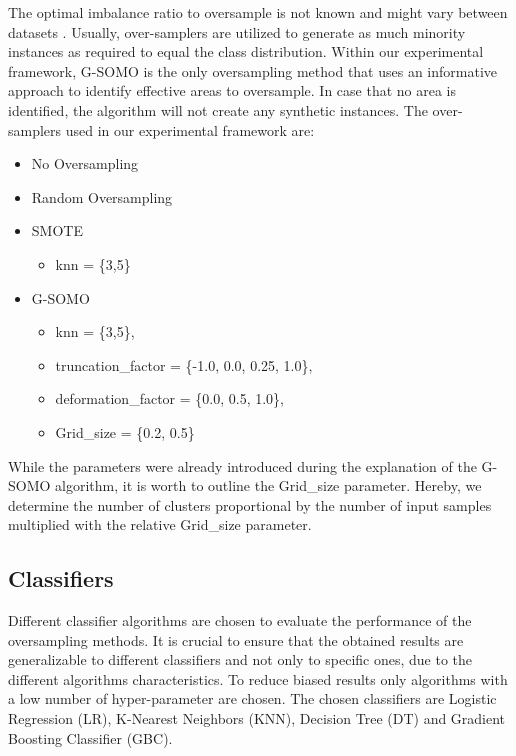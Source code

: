 \documentclass[parskip=full]{scrartcl}
\begin{document}
The optimal imbalance ratio to oversample is not known and might vary between
datasets \cite{Provost2018}. Usually, over-samplers are utilized to generate as
much minority instances as required to equal the class distribution. Within our
experimental framework, G-SOMO is the only oversampling method that uses an
informative approach to identify effective areas to oversample. In case that no
area is identified, the algorithm will not create any synthetic instances. The
over-samplers used in our experimental framework are:

\begin{itemize}
  \item No Oversampling
  \item Random Oversampling 
  \item SMOTE 
    \begin{itemize}
 \item knn = \{3,5\}
 \end{itemize}
  \item G-SOMO 
  \begin{itemize}
 \item knn = \{3,5\},
 \item truncation\_factor = \{-1.0, 0.0, 0.25, 1.0\},
 \item deformation\_factor = \{0.0, 0.5, 1.0\},
 \item Grid\_size = \{0.2, 0.5\}
 \end{itemize}
\end{itemize}

While the parameters were already introduced during the explanation of the
G-SOMO algorithm, it is worth to outline the Grid\_size parameter. Hereby, we
determine the number of clusters proportional by the number of input samples
multiplied with the relative Grid\_size parameter.

\subsection{Classifiers}

Different classifier algorithms are chosen to evaluate the performance of the
oversampling methods. It is crucial to ensure that the obtained results are
generalizable to different classifiers and not only to specific ones, due to the
different algorithms characteristics. To reduce biased results only algorithms
with a low number of hyper-parameter are chosen. The chosen classifiers are
Logistic Regression (LR), K-Nearest Neighbors (KNN), Decision Tree (DT) and
Gradient Boosting Classifier (GBC).
\end{document}
